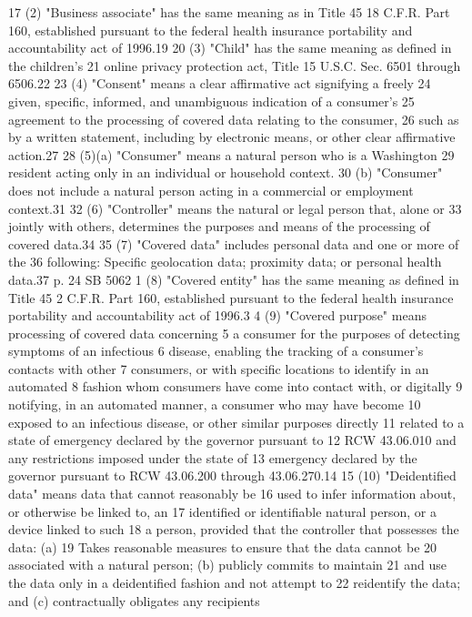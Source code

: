 17 (2) "Business associate" has the same meaning as in Title 45
18 C.F.R. Part 160, established pursuant to the federal health insurance
portability and accountability act of 1996.19
20 (3) "Child" has the same meaning as defined in the children's
21 online privacy protection act, Title 15 U.S.C. Sec. 6501 through
6506.22
23 (4) "Consent" means a clear affirmative act signifying a freely
24 given, specific, informed, and unambiguous indication of a consumer's
25 agreement to the processing of covered data relating to the consumer,
26 such as by a written statement, including by electronic means, or
other clear affirmative action.27
28 (5)(a) "Consumer" means a natural person who is a Washington
29 resident acting only in an individual or household context.
30 (b) "Consumer" does not include a natural person acting in a
commercial or employment context.31
32 (6) "Controller" means the natural or legal person that, alone or
33 jointly with others, determines the purposes and means of the
processing of covered data.34
35 (7) "Covered data" includes personal data and one or more of the
36 following: Specific geolocation data; proximity data; or personal
health data.37
p. 24 SB 5062
1 (8) "Covered entity" has the same meaning as defined in Title 45
2 C.F.R. Part 160, established pursuant to the federal health insurance
portability and accountability act of 1996.3
4 (9) "Covered purpose" means processing of covered data concerning
5 a consumer for the purposes of detecting symptoms of an infectious
6 disease, enabling the tracking of a consumer's contacts with other
7 consumers, or with specific locations to identify in an automated
8 fashion whom consumers have come into contact with, or digitally
9 notifying, in an automated manner, a consumer who may have become
10 exposed to an infectious disease, or other similar purposes directly
11 related to a state of emergency declared by the governor pursuant to
12 RCW 43.06.010 and any restrictions imposed under the state of
13 emergency declared by the governor pursuant to RCW 43.06.200 through
43.06.270.14
15 (10) "Deidentified data" means data that cannot reasonably be
16 used to infer information about, or otherwise be linked to, an
17 identified or identifiable natural person, or a device linked to such
18 a person, provided that the controller that possesses the data: (a)
19 Takes reasonable measures to ensure that the data cannot be
20 associated with a natural person; (b) publicly commits to maintain
21 and use the data only in a deidentified fashion and not attempt to
22 reidentify the data; and (c) contractually obligates any recipients
